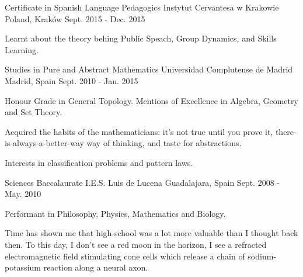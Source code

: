 

\begin{cventries}

  \cventry
    {Certificate in Spanish Language Pedagogics} %
    {Instytut Cervantesa w Krakowie} %
    {Poland, Kraków} %
    {Sept. 2015 - Dec. 2015} %
    {
      \begin{cvitems} %
        \item {Learnt about the theory behing Public Speach, Group Dynamics, and Skills Learning.}
      \end{cvitems}
    }

\cventry
    {Studies in Pure and Abstract Mathematics} %
    {Universidad Complutense de Madrid} %
    {Madrid, Spain} %
    {Sept. 2010 - Jan. 2015} %
    {
        \begin{cvitems} %
            \item {Honour Grade in General Topology. Mentions of Excellence in Algebra, Geometry and Set Theory.}
            \item {Acquired the habits of the mathematicians: it's not true until you prove it, there-is-always-a-better-way way of thinking, and taste for abstractions.}
            \item {Interests in classification problems and pattern laws.}
        \end{cvitems}
    }

\cventry
    {Sciences Baccalaurate} %
    {I.E.S. Luis de Lucena} %
    {Guadalajara, Spain} %
    {Sept. 2008 - May. 2010} %
    {
        \begin{cvitems} %
            \item {Performant in Philosophy, Physics, Mathematics and Biology.}
            \item {Time has shown me that high-school was a lot more valuable than I thought back then. To this day, I don't see a red moon in the horizon, I see a refracted electromagnetic field stimulating cone cells which release a chain of sodium-potassium reaction along a neural axon.}
        \end{cvitems}
    }

\end{cventries}
